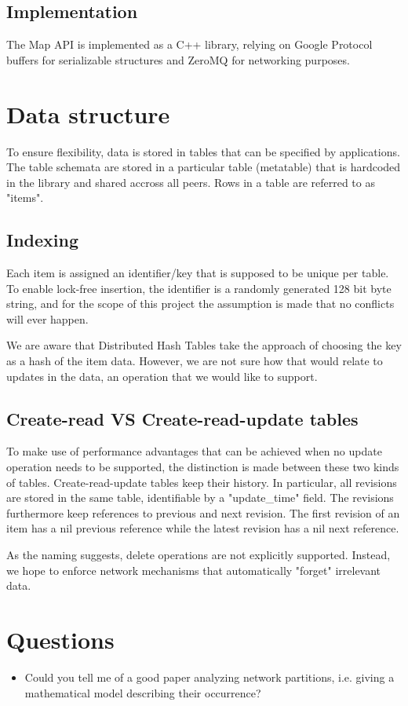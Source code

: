 \documentclass{article}
\begin{document}
\subsection{Implementation}

The Map API is implemented as a C++ library, relying on Google Protocol buffers
for serializable structures and ZeroMQ for networking purposes.

\section{Data structure}

To ensure flexibility, data is stored in tables that can be specified by
applications. The table schemata are stored in a particular table (metatable) 
that is hardcoded in the library and shared accross all peers. Rows in a table
are referred to as "items".

\subsection{Indexing}

Each item is assigned an identifier/key that is supposed to be unique per table.
To enable lock-free insertion, the identifier is a randomly generated 128 bit 
byte string, and for the scope of this project the assumption is made that no
conflicts will ever happen.

We are aware that Distributed Hash Tables take the approach of choosing the key
as a hash of the item data. However, we are not sure how that would relate to
updates in the data, an operation that we would like to support.

\subsection{Create-read VS Create-read-update tables}

To make use of performance advantages that can be achieved when no update
operation needs to be supported, the distinction is made between these two
kinds of tables. Create-read-update tables keep their history. In particular,
all revisions are stored in the same table, identifiable by a "update\_time" 
field. The revisions furthermore keep references to previous and next revision.
The first revision of an item has a nil previous reference while the latest
revision has a nil next reference. 

As the naming suggests, delete operations are not explicitly supported. Instead,
we hope to enforce network mechanisms that automatically "forget" irrelevant
data.

\section{Questions}

\begin{itemize}
  \item Could you tell me of a good paper analyzing network partitions, i.e.
    giving a mathematical model describing their occurrence?
\end{itemize}
\end{document}
